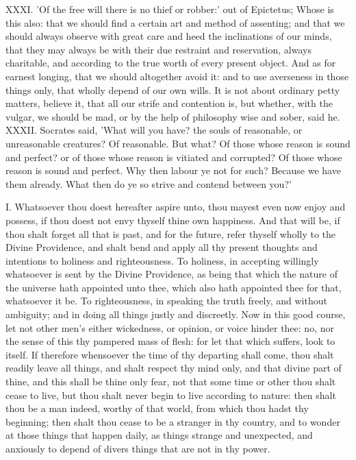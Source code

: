 XXXI. 'Of the free will there is no thief or robber:' out of Epictetus;
Whose is this also: that we should find a certain art and method of
assenting; and that we should always observe with great care and heed the
inclinations of our minds, that they may always be with their due
restraint and reservation, always charitable, and according to the true
worth of every present object. And as for earnest longing, that we should
altogether avoid it: and to use averseness in those things only, that
wholly depend of our own wills. It is not about ordinary petty matters,
believe it, that all our strife and contention is, but whether, with the
vulgar, we should be mad, or by the help of philosophy wise and sober,
said he. XXXII. Socrates said, 'What will you have? the souls of
reasonable, or unreasonable creatures? Of reasonable. But what? Of those
whose reason is sound and perfect? or of those whose reason is vitiated
and corrupted? Of those whose reason is sound and perfect. Why then labour
ye not for such? Because we have them already. What then do ye so strive
and contend between you?'


I. Whatsoever thou doest hereafter aspire unto, thou mayest even now
enjoy and possess, if thou doest not envy thyself thine own happiness. And
that will be, if thou shalt forget all that is past, and for the future,
refer thyself wholly to the Divine Providence, and shalt bend and apply
all thy present thoughts and intentions to holiness and righteousness. To
holiness, in accepting willingly whatsoever is sent by the Divine
Providence, as being that which the nature of the universe hath appointed
unto thee, which also hath appointed thee for that, whatsoever it be. To
righteousness, in speaking the truth freely, and without ambiguity; and in
doing all things justly and discreetly. Now in this good course, let not
other men's either wickedness, or opinion, or voice hinder thee: no, nor
the sense of this thy pampered mass of flesh: for let that which suffers,
look to itself. If therefore whensoever the time of thy departing shall
come, thou shalt readily leave all things, and shalt respect thy mind
only, and that divine part of thine, and this shall be thine only fear,
not that some time or other thou shalt cease to live, but thou shalt never
begin to live according to nature: then shalt thou be a man indeed, worthy
of that world, from which thou hadst thy beginning; then shalt thou cease
to be a stranger in thy country, and to wonder at those things that happen
daily, as things strange and unexpected, and anxiously to depend of divers
things that are not in thy power.

